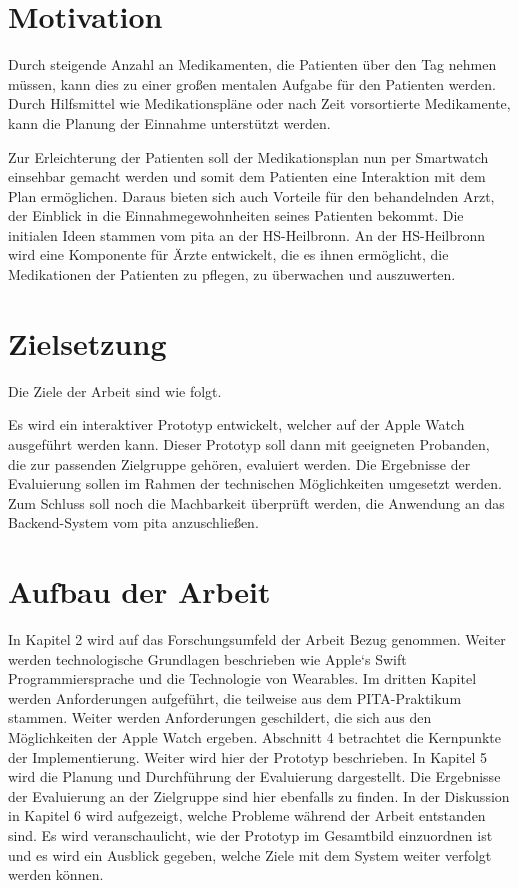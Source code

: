 \section{Motivation}
Durch steigende Anzahl an Medikamenten, die Patienten über den Tag nehmen müssen, kann dies zu einer großen mentalen Aufgabe für den Patienten werden. Durch Hilfsmittel wie Medikationspläne oder nach Zeit vorsortierte Medikamente, kann die Planung der Einnahme unterstützt werden. 

Zur Erleichterung der Patienten soll der Medikationsplan nun per Smartwatch einsehbar gemacht werden und somit dem Patienten eine Interaktion mit dem Plan ermöglichen. Daraus bieten sich auch Vorteile für den behandelnden Arzt, der Einblick in die Einnahmegewohnheiten seines Patienten bekommt. Die initialen Ideen stammen vom \gls{pita} an der HS-Heilbronn. An der HS-Heilbronn wird eine Komponente für Ärzte entwickelt, die es ihnen ermöglicht, die Medikationen der Patienten zu pflegen, zu überwachen und auszuwerten.
\section{Zielsetzung}
Die Ziele der Arbeit sind wie folgt.

Es wird ein interaktiver Prototyp entwickelt, welcher auf der Apple Watch ausgeführt werden kann. Dieser Prototyp soll dann mit geeigneten Probanden, die zur passenden Zielgruppe gehören, evaluiert werden.
Die Ergebnisse der Evaluierung sollen im Rahmen der technischen Möglichkeiten umgesetzt werden. Zum Schluss soll noch die Machbarkeit überprüft werden, die Anwendung an das Backend-System vom \gls{pita} anzuschließen.

\section{Aufbau der Arbeit}

In Kapitel 2 wird auf das Forschungsumfeld der Arbeit Bezug genommen. Weiter werden technologische Grundlagen beschrieben wie Apple`s Swift Programmiersprache und die Technologie von Wearables.
Im dritten Kapitel werden Anforderungen aufgeführt, die teilweise aus dem  PITA-Praktikum stammen. Weiter werden Anforderungen geschildert, die sich aus den Möglichkeiten der Apple Watch ergeben.
Abschnitt 4 betrachtet die Kernpunkte der Implementierung. Weiter wird hier der Prototyp beschrieben.
In Kapitel 5 wird die Planung und Durchführung der Evaluierung dargestellt. Die  Ergebnisse der Evaluierung an der Zielgruppe sind hier ebenfalls zu finden.
In der Diskussion in Kapitel 6 wird aufgezeigt, welche Probleme während der Arbeit entstanden sind. Es wird veranschaulicht, wie der Prototyp im Gesamtbild einzuordnen ist und es wird ein Ausblick gegeben, welche Ziele mit dem System weiter verfolgt werden können.

